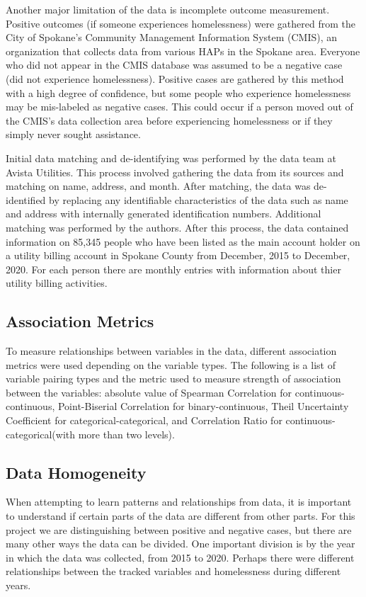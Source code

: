\documentclass[12pt]{report}
\begin{document}
Another major limitation of the data is incomplete outcome measurement. Positive outcomes (if someone experiences homelessness) were gathered from the City of Spokane's Community Management Information System (CMIS), an organization that collects data from various HAPs in the Spokane area. Everyone who did not appear in the CMIS database was assumed to be a negative case (did not experience homelessness). Positive cases are gathered by this method with a high degree of confidence, but some people who experience homelessness may be mis-labeled as negative cases. This could occur if a person moved out of the CMIS's data collection area before experiencing homelessness or if they simply never sought assistance.

Initial data matching and de-identifying was performed by the data team at Avista Utilities. This process involved gathering the data from its sources and matching on name, address, and month. After matching, the data was de-identified by replacing any identifiable characteristics of the data such as name and address with internally generated identification numbers. Additional matching was performed by the authors. After this process, the data contained information on 85,345 people who have been listed as the main account holder on a utility billing account in Spokane County from December, 2015 to December, 2020. For each person there are monthly entries with information about thier utility billing activities. 

\subsection{Association Metrics}
To measure relationships between variables in the data, different association metrics were used depending on the variable types. The following is a list of variable pairing types and the metric used to measure strength of association between the variables: absolute value of Spearman Correlation for continuous-continuous, Point-Biserial Correlation for binary-continuous, Theil Uncertainty Coefficient for categorical-categorical, and Correlation Ratio for continuous-categorical(with more than two levels).

\subsection{Data Homogeneity}
When attempting to learn patterns and relationships from data, it is important to understand if certain parts of the data are different from other parts. For this project we are distinguishing between positive and negative cases, but there are many other ways the data can be divided. One important division is by the year in which the data was collected, from 2015 to 2020. Perhaps there were different relationships between the tracked variables and homelessness during different years. 
\end{document}
